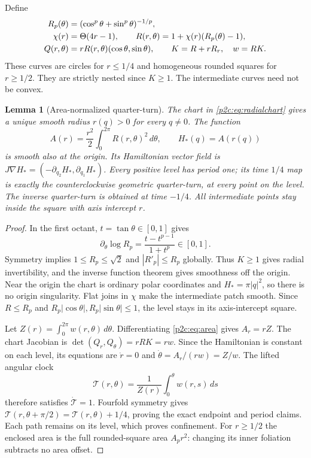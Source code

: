 \documentclass[11pt]{article}
\numberwithin{equation}{section}
\newtheorem{lemma}[theorem]{Lemma}
\theoremstyle{definition}
\theoremstyle{remark}
\begin{document}
Define
\begin{align}
 R_p(\theta)&=(\cos^p\theta+\sin^p\theta)^{-1/p},\notag\\
 \chi(r)&=\Theta(4r-1),\qquad
 R(r,\theta)=1+\chi(r)(R_p(\theta)-1),\notag\\
 Q(r,\theta)&=rR(r,\theta)(\cos\theta,\sin\theta),\qquad
 K=R+rR_r,\quad w=RK. \label{p2c:eq:radialchart}
\end{align}
These curves are circles for $r\leq1/4$ and homogeneous rounded
squares for $r\geq1/2$. They are strictly nested since $K\geq1$.
The intermediate curves need not be convex.

\begin{lemma}[Area-normalized quarter-turn]\label{p2c:lem:clock}
The chart in \eqref{p2c:eq:radialchart} gives a unique smooth radius
$r(q)>0$ for every $q\ne0$. The function
\begin{equation}\label{p2c:eq:area}
 A(r)=\frac{r^2}{2}\int_0^{2\pi}R(r,\theta)^2\,d\theta,
 \qquad H_*(q)=A(r(q))
\end{equation}
is smooth also at the origin. Its Hamiltonian vector field is
$J\nabla H_*=(-\partial_{q_2}H_*,\partial_{q_1}H_*)$.
Every positive level has period one; its time $1/4$ map is exactly
the counterclockwise geometric quarter-turn, at every point on
the level. The inverse quarter-turn is obtained at time $-1/4$.
All intermediate points stay inside the square with axis
intercept $r$.
\end{lemma}

\begin{proof}
In the first octant, $t=\tan\theta\in[0,1]$ gives
\[
 \partial_\theta\log R_p
       =\frac{t-t^{p-1}}{1+t^p}\in[0,1].
\]
Symmetry implies $1\leq R_p\leq\sqrt2$ and
$|R'_p|\leq R_p$ globally. Thus $K\geq1$ gives radial
invertibility, and the inverse function theorem gives smoothness
off the origin. Near the origin the chart is ordinary polar
coordinates and $H_*=\pi|q|^2$, so there is no origin singularity.
Flat joins in $\chi$ make the intermediate patch smooth.
Since $R\leq R_p$ and
$R_p|\cos\theta|,R_p|\sin\theta|\leq1$, the level stays in
its axis-intercept square.

Let $Z(r)=\int_0^{2\pi}w(r,\theta)\,d\theta$.
Differentiating \eqref{p2c:eq:area} gives $A_r=rZ$.
The chart Jacobian is $\det(Q_r,Q_\theta)=rRK=rw$.
Since the Hamiltonian is constant on each level, its equations
are
$\dot r=0$ and $\dot\theta=A_r/(rw)=Z/w$.
The lifted angular clock
\begin{equation}\label{p2c:eq:angleclock}
 \mathcal T(r,\theta)=\frac1{Z(r)}
                         \int_0^\theta w(r,s)\,ds
\end{equation}
therefore satisfies $\dot{\mathcal T}=1$.
Fourfold symmetry gives
$\mathcal T(r,\theta+\pi/2)=\mathcal T(r,\theta)+1/4$,
proving the exact endpoint and period claims. Each path remains
on its level, which proves confinement. For $r\geq1/2$ the
enclosed area is the full rounded-square area $A_p r^2$:
changing its inner foliation subtracts no area offset.
\end{proof}
\end{document}
